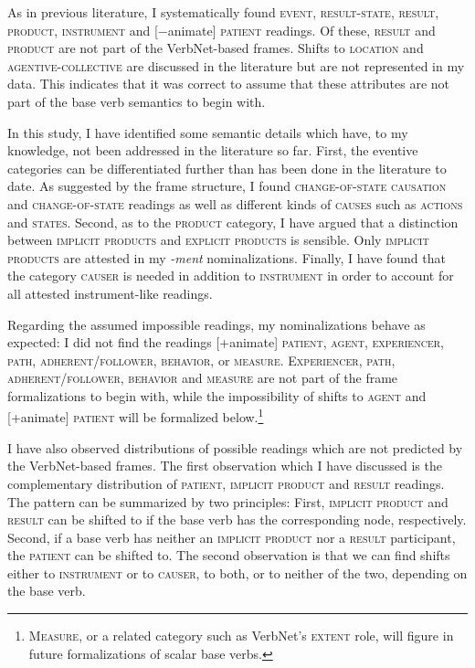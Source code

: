 As in previous literature, I systematically found \textsc{event, result-state, result, product, instrument} and [−animate] \textsc{patient} readings. 
Of these, \textsc{result} and \textsc{product} are not part of the VerbNet-based frames. 
Shifts to \textsc{location} and \textsc{agentive-collective} are discussed in the literature but are not represented in my data. This indicates that it was correct to assume that these attributes are not part of the base verb semantics to begin with.

\begin{sloppypar}
In this study, I have identified some semantic details which have, to my knowledge, not been addressed in the literature so far. 
First, the eventive categories can be differentiated further than has been done in the literature to date. As suggested by the frame structure, I found \textsc{change-of-state causation} and \textsc{change-of-state} readings as well as different kinds of \textsc{causes} such as \textsc{actions} and \textsc{states}. 
Second, as to the \textsc{product} category, I have argued that a distinction between \textsc{implicit products} and \textsc{explicit products} is sensible. Only \textsc{implicit products} are attested in my \textit{-ment} nominalizations.
Finally, I have found that the category \textsc{causer} is needed in addition to \textsc{instrument} in order to account for all attested instrument-like readings. 
\end{sloppypar}

Regarding the assumed impossible readings, my nominalizations behave as expected: I did not find the readings [+animate] \textsc{patient, agent, experiencer, path, adherent/follower, behavior,} or \textsc{measure}. \textsc{Experiencer, path, adherent/follower, behavior} and \textsc{measure} are not part of the frame formalizations to begin with, while the impossibility of shifts to \textsc{agent} and [+animate] \textsc{patient} will be formalized below.\footnote{\textsc{Measure}, or a related category such as VerbNet's \textsc{extent} role, will figure in future formalizations of scalar base verbs.}

I have also observed distributions of possible readings which are not predicted by the VerbNet-based frames. 
The first observation which I have discussed is the complementary distribution of \textsc{patient, implicit product} and \textsc{result} readings. The pattern can be summarized by two principles: 
First, \textsc{implicit product} and \textsc{result} can be shifted to if the base verb has the corresponding node, respectively.
Second, if a base verb has neither an \textsc{implicit product} nor a \textsc{result} participant, the \textsc{patient} can be shifted to.
The second observation is that we can find shifts either to \textsc{instrument} or to \textsc{causer}, to both, or to neither of the two, depending on the base verb.  

